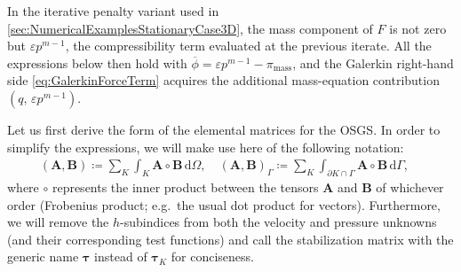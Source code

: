 \begin{remark}
In the iterative penalty variant used in \cref{sec:NumericalExamplesStationaryCase3D}, the mass component of $F$ is not zero but $\varepsilon p^{m-1}$, the compressibility term evaluated at the previous iterate. All the expressions below then hold with $\overline{\phi} = \varepsilon p^{m-1} - \pi_{\mathrm{mass}}$, and the Galerkin right{\hyp}hand side \cref{eq:GalerkinForceTerm} acquires the additional mass{\hyp}equation contribution $(q,\, \varepsilon p^{m-1})$.
\end{remark}

Let us first derive the form of the elemental matrices for the OSGS. In order to simplify the expressions, we will make use here of the following notation:
\begin{align}
  \left ( \boldsymbol{A}, \boldsymbol{B} \right ) \coloneqq \sum_K{\int_K{ \boldsymbol{A} \circ \boldsymbol{B} \, \mathrm{d}\Omega}},\quad
  \left ( \boldsymbol{A}, \boldsymbol{B} \right )_\Gamma \coloneqq \sum_K{\int_{\partial K \cap \Gamma}{ \boldsymbol{A} \circ \boldsymbol{B} \, \mathrm{d}\Gamma}},\quad
\end{align}
where $\circ$ represents the inner product between the tensors $\boldsymbol{A}$ and $\boldsymbol{B}$ of whichever order (Frobenius product; e.g.\, the usual dot product for vectors). Furthermore, we will remove the $h$-subindices from both the velocity and pressure unknowns (and their corresponding test functions) and call the stabilization matrix with the generic name $\boldsymbol{\tau}$ instead of $\boldsymbol{\tau}_K$ for conciseness.

